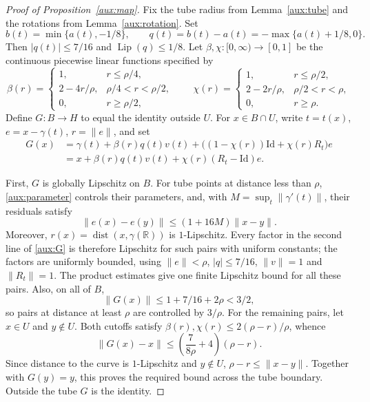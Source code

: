 \documentclass[11pt]{article}
\newcommand{\R}{\mathbb R}
\newcommand{\norm}[1]{\lVert #1\rVert}
\DeclareMathOperator{\Lip}{Lip}
\theoremstyle{definition}
\numberwithin{equation}{section}
\begin{document}
\begin{proof}[Proof of Proposition~\ref{aux:map}]
Fix the tube radius from Lemma~\ref{aux:tube} and the rotations from
Lemma~\ref{aux:rotation}. Set
\[
 b(t)=\min\{a(t),-1/8\},\qquad
 q(t)=b(t)-a(t)=-\max\{a(t)+1/8,0\}.
\]
Then $|q(t)|\le7/16$ and $\Lip(q)\le1/8$. Let
$\beta,\chi:[0,\infty)\to[0,1]$ be the continuous piecewise linear
functions specified by
\[
 \beta(r)=
 \begin{cases}
 1,&r\le\rho/4,\\
 2-4r/\rho,&\rho/4<r<\rho/2,\\
 0,&r\ge\rho/2,
 \end{cases}
 \qquad
 \chi(r)=
 \begin{cases}
 1,&r\le\rho/2,\\
 2-2r/\rho,&\rho/2<r<\rho,\\
 0,&r\ge\rho.
 \end{cases}
\]
Define $G:B\to H$ to equal the identity outside $U$. For $x\in B\cap U$,
write $t=t(x)$, $e=x-\gamma(t)$, $r=\norm{e}$, and set
\begin{equation}\label{aux:G}
 \begin{split}
 G(x)&=\gamma(t)+\beta(r)q(t)v(t)
       +\bigl((1-\chi(r))\mathrm{Id}+\chi(r)R_t\bigr)e\\
 &=x+\beta(r)q(t)v(t)+\chi(r)(R_t-\mathrm{Id})e.
 \end{split}
\end{equation}

First, $G$ is globally Lipschitz on $B$. For tube points at distance
less than $\rho$, \eqref{aux:parameter} controls their parameters,
and, with $M=\sup_t\norm{\gamma'(t)}$, their residuals satisfy
\[
 \norm{e(x)-e(y)}\le(1+16M)\norm{x-y}.
\]
Moreover, $r(x)=\operatorname{dist}(x,\gamma(\R))$ is
$1$-Lipschitz. Every factor in the second line of \eqref{aux:G} is
therefore Lipschitz for such pairs with uniform constants; the factors
are uniformly bounded, using $\norm{e}<\rho$, $|q|\le7/16$,
$\norm{v}=1$ and $\norm{R_t}=1$. The product estimates give one
finite Lipschitz bound for all these pairs. Also, on all of $B$,
\[
 \norm{G(x)}\le1+7/16+2\rho<3/2,
\]
so pairs at distance at least $\rho$ are controlled by $3/\rho$.
For the remaining pairs, let $x\in U$ and $y\notin U$. Both cutoffs
satisfy $\beta(r),\chi(r)\le2(\rho-r)/\rho$, whence
\[
 \norm{G(x)-x}
 \le\left(\frac{7}{8\rho}+4\right)(\rho-r).
\]
Since distance to the curve is $1$-Lipschitz and $y\notin U$,
$\rho-r\le\norm{x-y}$. Together with $G(y)=y$, this proves the
required bound across the tube boundary. Outside the tube $G$ is the
identity.


\end{proof}
\end{document}
